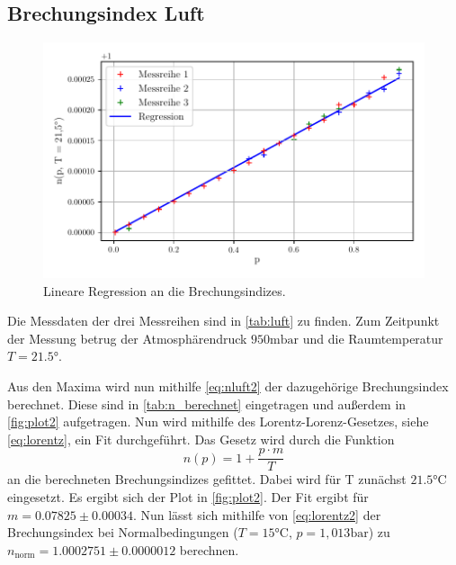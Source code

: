 \subsection{Brechungsindex Luft}
\begin{figure}
    \centering
    \includegraphics[width = 0.7 \linewidth]{build/Luft.pdf}
    \caption{Lineare Regression an die Brechungsindizes.}
    \label{fig:plot2}
\end{figure}
Die Messdaten der drei Messreihen sind in \autoref{tab:luft} zu finden.
Zum Zeitpunkt der Messung betrug der Atmosphärendruck $950 \unit{\milli\bar}$ und die Raumtemperatur $T = 21.5 \unit\degree$.


Aus den Maxima wird nun mithilfe \autoref{eq:nluft2} der dazugehörige Brechungsindex berechnet.
Diese sind in \autoref{tab:n_berechnet} eingetragen und außerdem in \autoref{fig:plot2} aufgetragen.
Nun wird mithilfe des Lorentz-Lorenz-Gesetzes, siehe \autoref{eq:lorentz}, ein Fit durchgeführt.
Das Gesetz wird durch die Funktion
\begin{equation} \label{eq:lorentz2}
    n(p) = 1 + \frac{p \cdot m}{T}
\end{equation}
an die berechneten Brechungsindizes gefittet. Dabei wird für T zunächst $21.5\unit{\celsius}$ eingesetzt.
Es ergibt sich der Plot in \autoref{fig:plot2}.
Der Fit ergibt für $m = 0.07825 \pm 0.00034$.
Nun lässt sich mithilfe von \autoref{eq:lorentz2} der Brechungsindex bei Normalbedingungen ($T = 15 \unit{\celsius}$, $p = 1,013 \unit{\bar}$) zu $n_{\text{norm}} = 1.0002751 \pm 0.0000012$ berechnen.